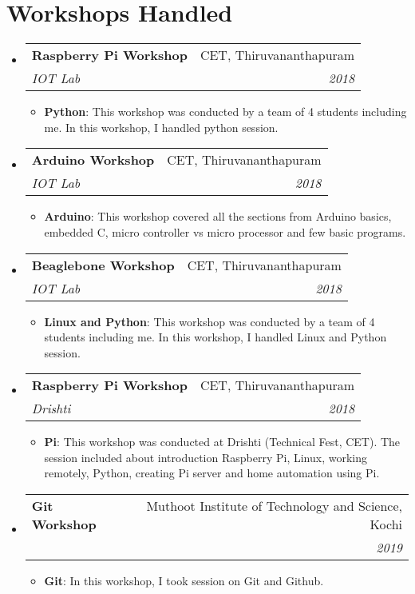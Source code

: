 \documentclass[letterpaper,11pt]{article}
\makeatletter
\newcommand{\resumeItem}[2]{
	\item\small{
    		\textbf{#1}{: #2 \vspace{-2pt}}
  	}
}
\newcommand{\resumeSubheading}[4]{
  	\vspace{-1pt}\item
    	\begin{tabular*}{0.97\textwidth}[t]{l@{\extracolsep{\fill}}r}
      		\textbf{#1} & #2 \\
      		\textit{\small#3} & \textit{\small #4} \\
    	\end{tabular*}\vspace{-5pt}
}
\newcommand{\resumeSubHeadingListStart}{\begin{itemize}[leftmargin=*]}
\newcommand{\resumeSubHeadingListEnd}{\end{itemize}}
\newcommand{\resumeItemListStart}{\begin{itemize}}
\newcommand{\resumeItemListEnd}{\end{itemize}\vspace{-5pt}}
\makeatother
\begin{document}
\section{Workshops Handled}
  	\resumeSubHeadingListStart
    		\resumeSubheading
     			{Raspberry Pi Workshop}{CET, Thiruvananthapuram}
      			{IOT Lab}{2018}
      			\resumeItemListStart
       				 \resumeItem{Python}
          				{This workshop was conducted by a team of 4 students including me. In this workshop, I handled python session.}
      			\resumeItemListEnd
      		\resumeSubheading
      			{Arduino Workshop}{CET, Thiruvananthapuram}
     			{IOT Lab}{2018}
      			\resumeItemListStart
        				\resumeItem{Arduino}
          				{This workshop covered all the sections from Arduino basics, embedded C, micro controller vs micro processor and few basic programs.}
     	 		\resumeItemListEnd
      		\resumeSubheading
     		 	{Beaglebone Workshop}{CET, Thiruvananthapuram}
      			{IOT Lab}{2018}
      			\resumeItemListStart
        				\resumeItem{Linux and Python}
          				{This workshop was conducted by a team of 4 students including me. In this workshop, I handled Linux and Python session.}
      			\resumeItemListEnd
      		\resumeSubheading
      			{Raspberry Pi Workshop}{CET, Thiruvananthapuram}
     			{Drishti}{2018}
      			\resumeItemListStart
        				\resumeItem{Pi}
          				{This workshop was conducted at Drishti (Technical Fest, CET). The session included about introduction Raspberry Pi, Linux, working remotely, Python, creating Pi server and home automation using Pi.}
      			\resumeItemListEnd
      		\resumeSubheading
     			 {Git Workshop}{Muthoot Institute of Technology and Science, Kochi}
      			{}{2019}
     	 		\resumeItemListStart
        				\resumeItem{Git}
          				{In this workshop, I took session on Git and Github.}
      			\resumeItemListEnd
 	 \resumeSubHeadingListEnd

\end{document}
